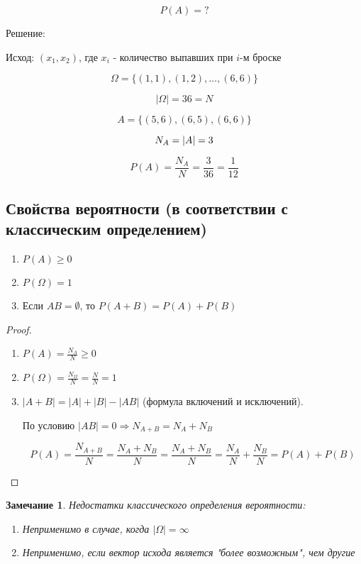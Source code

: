 \documentclass[a4paper, 14pt]{report}
\newtheorem{note}{Замечание}[section]
\begin{document}
$$
P(A) = ?
$$

Решение:

Исход: $(x_1, x_2)$, где $x_i$ - количество выпавших при $i$-м броске

$$
\Omega = \{ (1,1), (1,2), \dots, (6,6) \}
$$

$$
|\Omega| = 36 = N
$$

$$
A = \{ (5,6), (6,5), (6,6) \}
$$

$$
N_A = |A| = 3 \\
$$

$$
P(A) = \frac{N_A}{N} = \frac{3}{36} = \frac{1}{12}
$$

\subsection{Свойства вероятности (в соответствии с классическим определением)}

\begin{enumerate}
    \item $P(A) \geq 0$
    \item $P(\Omega) = 1$
    \item Если $AB = \emptyset$, то $P(A+B) = P(A) + P(B)$
\end{enumerate}

\begin{proof}
    \begin{enumerate}
        \item $P(A) = \frac{N_A}{N} \geq 0$
        \item $P(\Omega) = \frac{N_\Omega}{N} = \frac{N}{N} = 1$
        \item $|A+B|=|A|+|B|-|AB|$ (формула включений и исключений). 
            
            По условию $|AB|=0 \Rightarrow N_{A+B} = N_A + N_B$

            $$
            P(A) = \frac{N_{A+B}}{N} = \frac{N_A + N_B}{N} = \frac{N_A+N_B}{N}=\frac{N_A}{N} + \frac{N_B}{N} = P(A) + P(B)
            $$
    \end{enumerate}
\end{proof}

\begin{note}
    Недостатки классического определения вероятности:

    \begin{enumerate}
        \item Неприменимо в случае, когда $|\Omega| = \infty$
        \item Неприменимо, если вектор исхода является "более возможным", чем другие
    \end{enumerate}
\end{note}
\end{document}
